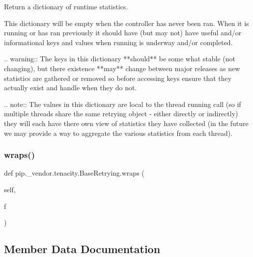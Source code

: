 \begin{DoxyVerb}Return a dictionary of runtime statistics.

This dictionary will be empty when the controller has never been
ran. When it is running or has ran previously it should have (but
may not) have useful and/or informational keys and values when
running is underway and/or completed.

.. warning:: The keys in this dictionary **should** be some what
     stable (not changing), but there existence **may**
     change between major releases as new statistics are
     gathered or removed so before accessing keys ensure that
     they actually exist and handle when they do not.

.. note:: The values in this dictionary are local to the thread
  running call (so if multiple threads share the same retrying
  object - either directly or indirectly) they will each have
  there own view of statistics they have collected (in the
  future we may provide a way to aggregate the various
  statistics from each thread).
\end{DoxyVerb}
 \mbox{\label{classpip_1_1__vendor_1_1tenacity_1_1BaseRetrying_a2bd862a3771b5ae08f129f5ca6c749be}} 
\subsubsection{\texorpdfstring{wraps()}{wraps()}}
{\footnotesize\ttfamily def pip.\+\_\+vendor.\+tenacity.\+Base\+Retrying.\+wraps (\begin{DoxyParamCaption}\item[{}]{self,  }\item[{}]{f }\end{DoxyParamCaption})}



\subsection{Member Data Documentation}
\mbox{\label{classpip_1_1__vendor_1_1tenacity_1_1BaseRetrying_a30a5819f77176f9a2c9ecade5c29e454}} 

